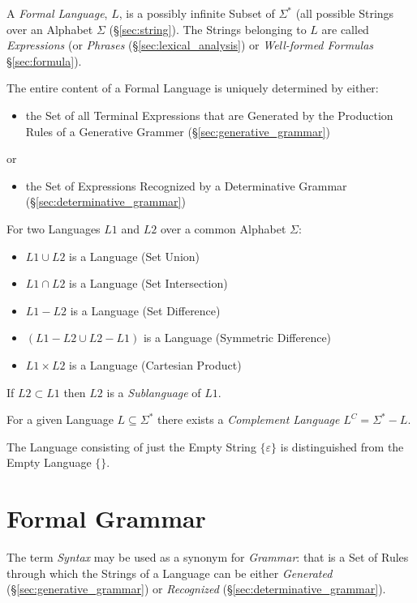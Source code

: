 A \emph{Formal Language}, $L$, is a possibly infinite Subset of
$\Sigma^*$ (all possible Strings over an Alphabet $\Sigma$
(\S\ref{sec:string}). The Strings belonging to $L$ are called
\emph{Expressions} (or \emph{Phrases} (\S\ref{sec:lexical_analysis})
or \emph{Well-formed Formulas} \S\ref{sec:formula}).

The entire content of a Formal Language is uniquely determined by
either:
\begin{itemize}
\item the Set of all Terminal Expressions that are Generated by the
  Production Rules of a Generative Grammer
  (\S\ref{sec:generative_grammar})
\end{itemize}
or
\begin{itemize}
\item the Set of Expressions Recognized by a Determinative Grammar
  (\S\ref{sec:determinative_grammar})
\end{itemize}

For two Languages $L1$ and $L2$ over a common Alphabet $\Sigma$:
\begin{itemize}
    \item $L1 \cup L2$ is a Language (Set Union)
    \item $L1 \cap L2$ is a Language (Set Intersection)
    \item $L1 - L2$ is a Language (Set Difference)
    \item $(L1 - L2 \cup L2 - L1)$ is a Language (Symmetric Difference)
    \item $L1 \times L2$ is a Language (Cartesian Product)
\end{itemize}
If $L2 \subset L1$ then $L2$ is a \emph{Sublanguage} of $L1$.

For a given Language $L \subseteq \Sigma^*$ there exists a
\emph{Complement Language} $L^C = \Sigma^* - L$.

The Language consisting of just the Empty String $\{\varepsilon\}$ is
distinguished from the Empty Language $\{\}$.



\section{Formal Grammar}\label{sec:formal_grammar}

The term \emph{Syntax} may be used as a synonym for \emph{Grammar}:
that is a Set of Rules through which the Strings of a Language can be
either \emph{Generated} (\S\ref{sec:generative_grammar}) or
\emph{Recognized} (\S\ref{sec:determinative_grammar}).

